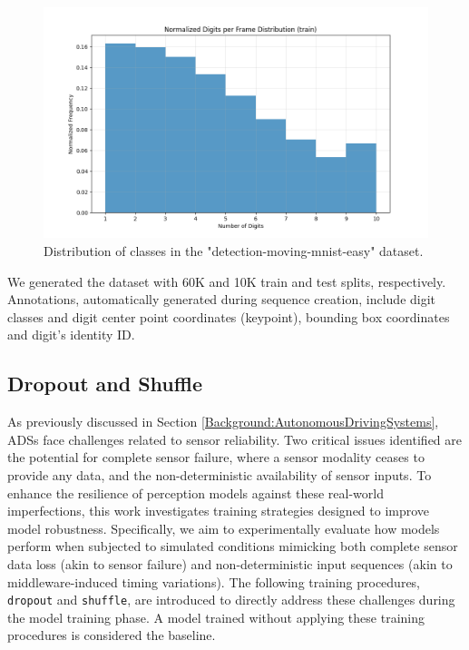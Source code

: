 \begin{figure}
    \centering
    \includegraphics[width=\textwidth]{figures/figure_method_dataset_train_digits_per_frame.png}
    \caption{Distribution of classes in the "detection-moving-mnist-easy" dataset.}
    \label{fig:figure_method_dataset_train_digits_per_frame}
\end{figure}

We generated the dataset with 60K and 10K train and test splits, respectively. Annotations, automatically generated during sequence creation, include digit classes and digit center point coordinates (keypoint), bounding box coordinates and digit's identity ID.

\subsection{Dropout and Shuffle} \label{Methods:Training:DropoutAndShuffle}

As previously discussed in Section \ref{Background:AutonomousDrivingSystems}, ADSs face challenges related to sensor reliability. Two critical issues identified are the potential for complete sensor failure, where a sensor modality ceases to provide any data, and the non-deterministic availability of sensor inputs. To enhance the resilience of perception models against these real-world imperfections, this work investigates training strategies designed to improve model robustness. Specifically, we aim to experimentally evaluate how models perform when subjected to simulated conditions mimicking both complete sensor data loss (akin to sensor failure) and non-deterministic input sequences (akin to middleware-induced timing variations). The following training procedures, \texttt{dropout} and \texttt{shuffle}, are introduced to directly address these challenges during the model training phase. A model trained without applying these training procedures is considered the baseline.

